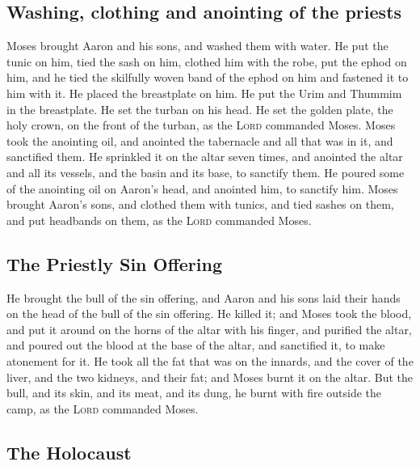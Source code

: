 \hypertarget{washing-clothing-and-anointing-of-the-priests}{%
\subsection{Washing, clothing and anointing of the
priests}\label{washing-clothing-and-anointing-of-the-priests}}

 Moses brought Aaron and his sons, and washed them with
water.  He put the tunic on him, tied the sash on him,
clothed him with the robe, put the ephod on him, and he tied the
skilfully woven band of the ephod on him and fastened it to him with it.
 He placed the breastplate on him. He put the Urim and
Thummim in the breastplate.  He set the turban on his
head. He set the golden plate, the holy crown, on the front of the
turban, as the \textsc{Lord} commanded Moses.  Moses took
the anointing oil, and anointed the tabernacle and all that was in it,
and sanctified them.  He sprinkled it on the altar seven
times, and anointed the altar and all its vessels, and the basin and its
base, to sanctify them.  He poured some of the anointing
oil on Aaron's head, and anointed him, to sanctify him. 
Moses brought Aaron's sons, and clothed them with tunics, and tied
sashes on them, and put headbands on them, as the \textsc{Lord}
commanded Moses.

\hypertarget{the-priestly-sin-offering}{%
\subsection{The Priestly Sin Offering}\label{the-priestly-sin-offering}}

 He brought the bull of the sin offering, and Aaron and
his sons laid their hands on the head of the bull of the sin offering.
 He killed it; and Moses took the blood, and put it
around on the horns of the altar with his finger, and purified the
altar, and poured out the blood at the base of the altar, and sanctified
it, to make atonement for it.  He took all the fat that
was on the innards, and the cover of the liver, and the two kidneys, and
their fat; and Moses burnt it on the altar.  But the
bull, and its skin, and its meat, and its dung, he burnt with fire
outside the camp, as the \textsc{Lord} commanded Moses.

\hypertarget{the-holocaust}{%
\subsection{The Holocaust}\label{the-holocaust}}

